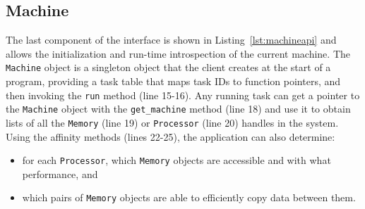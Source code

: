 



\subsection{Machine}
\label{subsec:machmodel}
The last component of the interface is shown in Listing~\ref{lst:machineapi} and allows the
initialization and run-time introspection
of the current machine.
The {\tt Machine} object is a singleton object that the client creates at the start of a
program, providing a task table that maps task IDs to function pointers,
and then invoking the {\tt run} method (line 15-16).
Any running task can get a pointer to the {\tt Machine} object with the
{\tt get\_machine} method (line 18) and use it to obtain lists of all the {\tt Memory} (line 19) or 
{\tt Processor} (line 20) handles in the system.  Using the affinity methods (lines 22-25),
the application can also determine:
\begin{itemize} \itemsep1pt \parskip0pt 
\item for each {\tt Processor}, which {\tt Memory} objects are accessible and with what performance, and
\item which pairs of {\tt Memory} objects are able to efficiently copy data between them.
\end{itemize}


